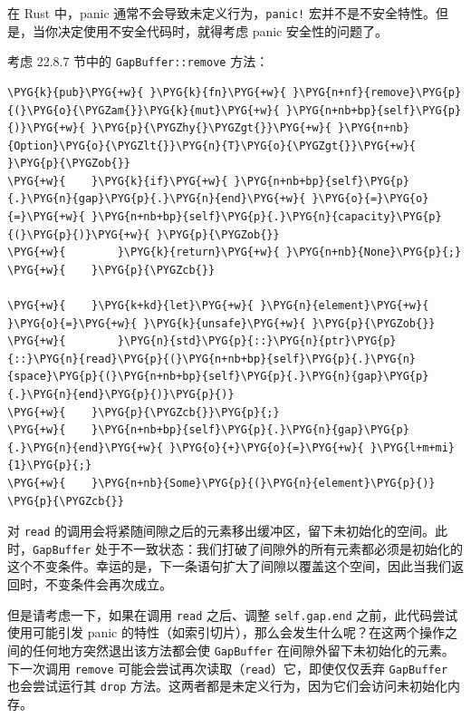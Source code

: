 在 Rust 中，panic 通常不会导致未定义行为，\texttt{panic!} 宏并不是不安全特性。但是，当你决定使用不安全代码时，就得考虑 panic 安全性的问题了。

考虑 22.8.7 节中的 \texttt{GapBuffer::remove} 方法：

\begin{Verbatim}[commandchars=\\\{\},breaklines=true,breakanywhere=true,fontsize=\codefont,xleftmargin=17bp]
\PYG{k}{pub}\PYG{+w}{ }\PYG{k}{fn}\PYG{+w}{ }\PYG{n+nf}{remove}\PYG{p}{(}\PYG{o}{\PYGZam{}}\PYG{k}{mut}\PYG{+w}{ }\PYG{n+nb+bp}{self}\PYG{p}{)}\PYG{+w}{ }\PYG{p}{\PYGZhy{}\PYGZgt{}}\PYG{+w}{ }\PYG{n+nb}{Option}\PYG{o}{\PYGZlt{}}\PYG{n}{T}\PYG{o}{\PYGZgt{}}\PYG{+w}{ }\PYG{p}{\PYGZob{}}
\PYG{+w}{    }\PYG{k}{if}\PYG{+w}{ }\PYG{n+nb+bp}{self}\PYG{p}{.}\PYG{n}{gap}\PYG{p}{.}\PYG{n}{end}\PYG{+w}{ }\PYG{o}{=}\PYG{o}{=}\PYG{+w}{ }\PYG{n+nb+bp}{self}\PYG{p}{.}\PYG{n}{capacity}\PYG{p}{(}\PYG{p}{)}\PYG{+w}{ }\PYG{p}{\PYGZob{}}
\PYG{+w}{        }\PYG{k}{return}\PYG{+w}{ }\PYG{n+nb}{None}\PYG{p}{;}
\PYG{+w}{    }\PYG{p}{\PYGZcb{}}

\PYG{+w}{    }\PYG{k+kd}{let}\PYG{+w}{ }\PYG{n}{element}\PYG{+w}{ }\PYG{o}{=}\PYG{+w}{ }\PYG{k}{unsafe}\PYG{+w}{ }\PYG{p}{\PYGZob{}}
\PYG{+w}{        }\PYG{n}{std}\PYG{p}{::}\PYG{n}{ptr}\PYG{p}{::}\PYG{n}{read}\PYG{p}{(}\PYG{n+nb+bp}{self}\PYG{p}{.}\PYG{n}{space}\PYG{p}{(}\PYG{n+nb+bp}{self}\PYG{p}{.}\PYG{n}{gap}\PYG{p}{.}\PYG{n}{end}\PYG{p}{)}\PYG{p}{)}
\PYG{+w}{    }\PYG{p}{\PYGZcb{}}\PYG{p}{;}
\PYG{+w}{    }\PYG{n+nb+bp}{self}\PYG{p}{.}\PYG{n}{gap}\PYG{p}{.}\PYG{n}{end}\PYG{+w}{ }\PYG{o}{+}\PYG{o}{=}\PYG{+w}{ }\PYG{l+m+mi}{1}\PYG{p}{;}
\PYG{+w}{    }\PYG{n+nb}{Some}\PYG{p}{(}\PYG{n}{element}\PYG{p}{)}
\PYG{p}{\PYGZcb{}}
\end{Verbatim}

对 \texttt{read} 的调用会将紧随间隙之后的元素移出缓冲区，留下未初始化的空间。此时，\texttt{GapBuffer} 处于不一致状态：我们打破了间隙外的所有元素都必须是初始化的这个不变条件。幸运的是，下一条语句扩大了间隙以覆盖这个空间，因此当我们返回时，不变条件会再次成立。

但是请考虑一下，如果在调用 \texttt{read} 之后、调整 \texttt{self.gap.end} 之前，此代码尝试使用可能引发 panic 的特性（如索引切片），那么会发生什么呢？在这两个操作之间的任何地方突然退出该方法都会使 \texttt{GapBuffer} 在间隙外留下未初始化的元素。下一次调用 \texttt{remove} 可能会尝试再次读取（\texttt{read}）它，即使仅仅丢弃 \texttt{GapBuffer} 也会尝试运行其 \texttt{drop} 方法。这两者都是未定义行为，因为它们会访问未初始化内存。

